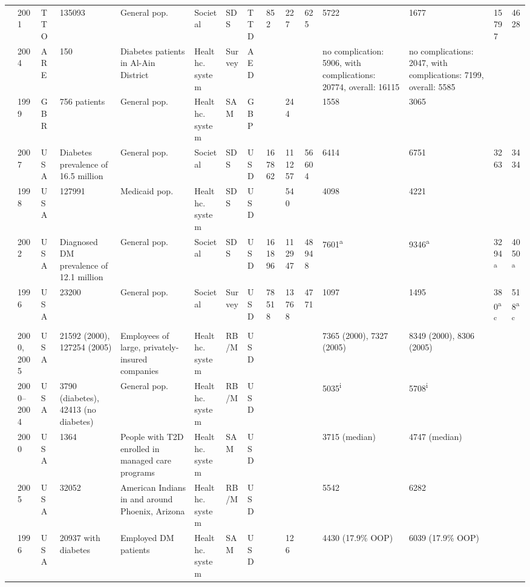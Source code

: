 \documentclass[12pt,english]{article}
\begin{document}
\begin{appendix}
\begin{landscape}
\begin{tabularx}{\linewidth}{Z X X Z Z X X X X X X X X Y Y}
\textcite{Abdulkadri2009b} & 2001 & TTO & 135093 & General pop. & Societal & SDS & TTD & 852 & 227 & 625 & 5722 & 1677 & 15797 & 4628 \\
\textcite{Al-Maskari2010c} & 2004 & ARE & 150 & Diabetes patients in Al-Ain District & Healthc. system & Survey & AED &  &  &  & no complication: 5906, with complications:   20774, overall: 16115 & no complications: 2047, with complications:   7199, overall: 5585 &  &  \\
\textcite{Jonsson2002b} & 1999 & GBR & 756 patients & General pop. & Healthc. system & SAM & GBP &  & 244 &  & 1558 & 3065 &  &  \\
\textcite{Dall2010} & 2007 & USA & Diabetes prevalence of 16.5 million & General pop. & Societal & SDS & USD & 167862 & 111257 & 56604 & 6414 & 6751 & 3263 & 3434 \\
\textcite{Buescher2010} & 1998 & USA & 127991 & Medicaid pop. & Healthc. system & SDS & USD &  & 540 &  & 4098 & 4221 &  &  \\
\textcite{Dall2003a} & 2002 & USA & Diagnosed DM prevalence of 12.1 million & General pop. & Societal & SDS & USD & 161896 & 112947 & 48948 & 7601\textsuperscript{a} & 9346\textsuperscript{a} & 3294\textsuperscript{a} & 4050\textsuperscript{a} \\
\textcite{Druss2001} & 1996 & USA & 23200 & General pop. & Societal & Survey & USD & 78518 & 13768 & 4771 & 1097 & 1495 & 380\textsuperscript{ac} & 518\textsuperscript{ac} \\
\textcite{Durden2009b} & 2000, 2005 & USA & 21592 (2000), 127254 (2005) & Employees of large, privately-insured   companies & Healthc. system & RB/M & USD &  &  &  & 7365 (2000), 7327 (2005) & 8349 (2000), 8306 (2005) &  &  \\
\textcite{Trogdon2008a} & 2000--2004 & USA & 3790 (diabetes), 42413 (no diabetes) & General pop. & Healthc. system & RB/M & USD &  &  &  & 5035\textsuperscript{i} & 5708\textsuperscript{i} &  &  \\
\textcite{Brandle2003d} & 2000 & USA & 1364 & People with T2D enrolled in managed care   programs & Healthc. system & SAM & USD &  &  &  & 3715 (median) & 4747 (median) &  &  \\
\textcite{Oconnell2012} & 2005 & USA & 32052 & American Indians in and around Phoenix,   Arizona & Healthc. system & RB/M & USD &  &  &  & 5542 & 6282 &  &  \\
\textcite{Peele2002a} & 1996 & USA & 20937 with diabetes & Employed DM patients & Healthc. system & SAM & USD &  & 126 &  & 4430 (17.9\% \ac{OOP}) & 6039 (17.9\% \ac{OOP}) &  &  \\

\end{tabularx}
\end{landscape}
\end{appendix}
\end{document}
